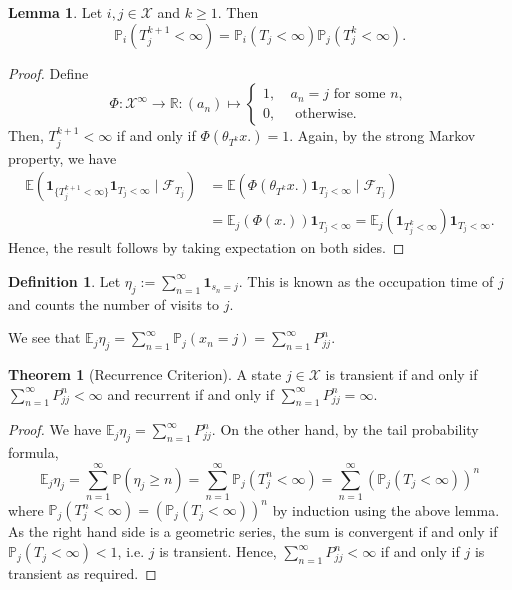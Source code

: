 \documentclass[]{article}
\theoremstyle{definition}
\newtheorem{theorem}{Theorem}
\theoremstyle{definition}
\newtheorem{definition}{Definition}[section]
\newtheorem{lemma}{Lemma}[section]
\begin{document}
\begin{lemma}
  Let \(i, j \in \mathcal{X}\) and \(k \ge 1\). Then 
  \[\mathbb{P}_i(T_j^{k + 1} < \infty) = \mathbb{P}_i(T_j < \infty) \mathbb{P}_j(T_j^k < \infty).\]
\end{lemma}
\begin{proof}
  Define 
  \[\Phi : \mathcal{X}^\infty \to \mathbb{R} : (a_n) \mapsto 
  \begin{cases}
    1, \ & a_n = j \text{ for some } n,\\
    0, \ & \text{ otherwise}.
  \end{cases}\]
  Then, \(T_j^{k + 1} < \infty\) if and only if \(\Phi(\theta_{T^k} x.) = 1\).
  Again, by the strong Markov property, we have 
  \[\begin{split}
    \mathbb{E}(\mathbf{1}_{\{T_j^{k + 1} < \infty\}}\mathbf{1}_{T_j < \infty} \mid \mathcal{F}_{T_j}) & = 
    \mathbb{E}(\Phi(\theta_{T^k} x.)\mathbf{1}_{T_j < \infty} \mid \mathcal{F}_{T_j})\\ 
    & = \mathbb{E}_j(\Phi(x.))\mathbf{1}_{T_j < \infty}
      = \mathbb{E}_j(\mathbf{1}_{T_j^{k} < \infty})\mathbf{1}_{T_j < \infty}.
  \end{split}\]
  Hence, the result follows by taking expectation on both sides.
\end{proof}

\begin{definition}
  Let \(\eta_j := \sum_{n = 1}^\infty \mathbf{1}_{s_n = j}\). This is known as the occupation 
  time of \(j\) and counts the number of visits to \(j\).
\end{definition}

We see that \(\mathbb{E}_j\eta_j = \sum_{n = 1}^\infty \mathbb{P}_j(x_n = j) = 
\sum_{n = 1}^\infty P_{jj}^n\). 

\begin{theorem}[Recurrence Criterion]
  A state \(j \in \mathcal{X}\) is transient if and only if \(\sum_{n = 1}^\infty P_{jj}^n < \infty\) 
  and recurrent if and only if \(\sum_{n = 1}^\infty P_{jj}^n = \infty\).
\end{theorem}
\begin{proof}
  We have \(\mathbb{E}_j\eta_j = \sum_{n = 1}^\infty P_{jj}^n\). On the other hand, 
  by the tail probability formula, 
  \[\mathbb{E}_j \eta_j = \sum_{n = 1}^\infty \mathbb{P}(\eta_j \ge n) = 
    \sum_{n = 1}^\infty \mathbb{P}_j(T^n_j < \infty) = \sum_{n = 1}^\infty(\mathbb{P}_j(T_j < \infty))^n\]
  where \(\mathbb{P}_j(T^n_j < \infty) = (\mathbb{P}_j(T_j < \infty))^n\) by 
  induction using the above lemma. As the right hand side is a geometric series, 
  the sum is convergent if and only if \(\mathbb{P}_j(T_j < \infty) < 1\), i.e. 
  \(j\) is transient. Hence, \(\sum_{n = 1}^\infty P_{jj}^n < \infty\) if and only 
  if \(j\) is transient as required.
\end{proof}
\end{document}
